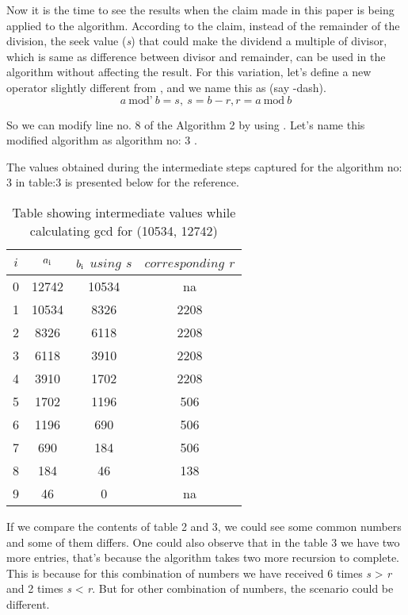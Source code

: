 \documentclass[conference]{IEEEtran}
\newcommand{\var}[1]{\textit{#1}}
\renewcommand{\mod}{\text{mod}}
\newcommand{\moddash}{\text{mod'}}
\begin{document}
Now it is the time to see the results when the claim made in this paper is being applied 
to the algorithm. According to the claim, instead of the remainder of the division, the seek value (\var{s}) that could make the dividend a multiple of divisor, which is same as difference between divisor and remainder, can be used in the algorithm without affecting the result. 
For this variation, let's define a new operator slightly different from \mod, and we name this as \moddash(say \mod -dash).
\begin{equation} \label{eq:gcd_modulus_1_1}
\var{a} \> \moddash \> \var{b} = \var{s}, \>  {s} = \var{b} - \var{r}, \var{r} = \var{a} \> \mod \> \var{b}
\end{equation}
  
So we can modify line no. 8 of the Algorithm 2 by using \moddash. Let's name this modified algorithm as algorithm no: 3 .  \linebreak


The values obtained during the intermediate steps captured for the algorithm no: 3 in table:3 is presented below for the reference.
\begin{table}[!htbp]
\caption{Table showing intermediate values while calculating gcd for (10534, 12742)}
\label{table:3}
\centering
	\begin{tabular}{c | c | c | c}
		\hline
		$i$ & $a\textsubscript{i}$ & $b\textsubscript{i} $ $using $ $s$ & $corresponding $ $r$\\ [0.5ex] 
		\hline
		0 & 12742 & 10534 & na  \\ 
		1 & 10534 & 8326  & 2208\\  
		2 & 8326  & 6118  & 2208\\
		3 & 6118  & 3910  & 2208\\
		4 & 3910   & 1702 & 2208\\
		5 & 1702   & 1196 & 506\\
		6 & 1196   & 690  & 506\\
		7 & 690    & 184  & 506\\
		8 & 184    & 46   & 138\\
		9 & 46     & 0    & na
	\end{tabular}
\end{table}

If we compare the contents of table 2 and 3, we could see some common numbers and some of them differs. One could also observe that in the table 3 we have two more entries, that's because the algorithm takes two more recursion to complete. This is because for 
this combination of numbers we have received 6 times \var{s} > \var{r} and 2 times 
\var{s} < \var{r}. But for other combination of numbers, the scenario could be different.
\end{document}
